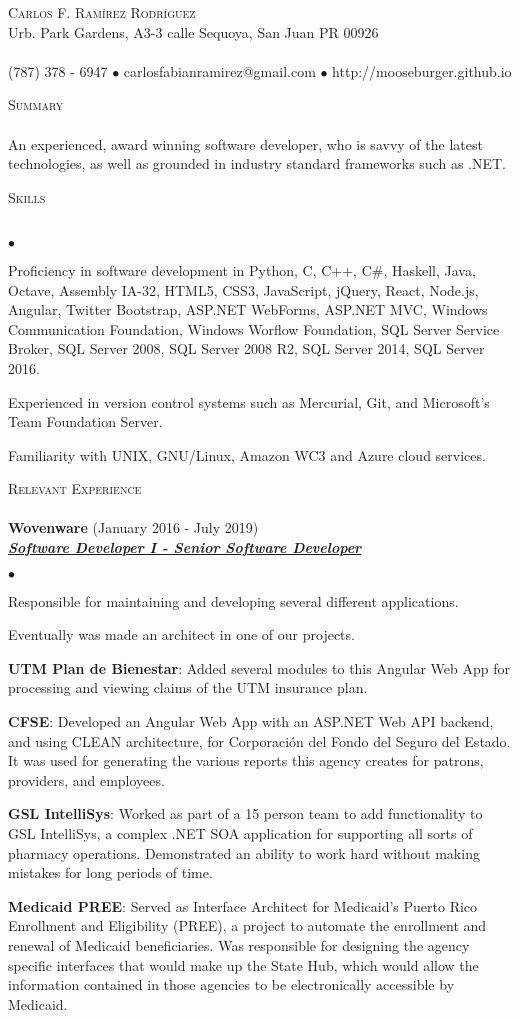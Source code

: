 \documentclass{article}
\newcommand{\lineunder}{\vspace*{-8pt} \\ \hspace*{-18pt} \hrulefill \\}
\newcommand{\header}[1]{{\hspace*{-15pt}\vspace*{6pt} \textsc{#1}} \vspace*{-6pt} \lineunder}
\newcommand{\employer}[3]{{ \textbf{#1} (#2)\\ \underline{\textbf{\emph{#3}}}\\  }}
\newcommand{\contact}[3]{
\vspace*{-8pt}
\begin{center}
{\LARGE \scshape {#1}}\\
#2 \lineunder 
#3
\end{center}
\vspace*{-8pt}
}
\newenvironment{achievements}{\begin{list}{$\bullet$}{\topsep 0pt \itemsep -2pt}}{\vspace*{4pt}\end{list}}
\begin{document}
\small
\smallskip
\vspace*{-44pt}

\contact{Carlos F. Ram\'irez Rodr\'iguez}
{Urb. Park Gardens, A3-3 calle Sequoya, San Juan PR 00926}
{(787) 378 - 6947 $\bullet$ carlosfabianramirez@gmail.com $\bullet$ http://mooseburger.github.io}

\header{Summary}
An experienced, award winning software developer, who is savvy of the latest technologies, as well as grounded in industry standard frameworks such as .NET.  

\header{Skills}
\begin{achievements}
\item Proficiency in software development in Python, C, C++, C\string#, Haskell, Java, Octave, Assembly IA-32, HTML5, CSS3, JavaScript, jQuery, React, Node.js, Angular, Twitter Bootstrap, ASP.NET WebForms, ASP.NET MVC, Windows Communication Foundation, Windows Worflow Foundation, SQL Server Service Broker, SQL Server 2008, SQL Server 2008 R2, SQL Server 2014, SQL Server 2016.
\item Experienced in version control systems such as Mercurial, Git, and Microsoft's Team Foundation Server.
\item Familiarity with UNIX, GNU/Linux, Amazon WC3 and Azure cloud services.
\end{achievements}

\header{Relevant Experience}

\employer{Wovenware}{January 2016 - July 2019}{Software Developer I - Senior Software Developer}
	\begin{achievements}
	\item Responsible for maintaining and developing several different applications.
	\item Eventually was made an architect in one of our projects.
	\item \textbf{UTM Plan de Bienestar}: Added several modules to this Angular Web App for processing and viewing claims of the UTM insurance plan.
	\item \textbf{CFSE}: Developed an Angular Web App with an ASP.NET Web API backend, and using CLEAN architecture, for Corporaci\'on del Fondo del Seguro del Estado. It was used for generating the various reports this agency creates for patrons, providers, and employees.
	\item \textbf{GSL IntelliSys}: Worked as part of a 15 person team to add functionality to GSL IntelliSys, a complex .NET SOA application for supporting all sorts of pharmacy operations. Demonstrated an ability to work hard without making mistakes for long periods of time.
	\item \textbf{Medicaid PREE}: Served as Interface Architect for Medicaid's Puerto Rico Enrollment and Eligibility (PREE), a project to automate the enrollment and renewal of Medicaid beneficiaries. Was responsible for designing the agency specific interfaces that would make up the State Hub, which would allow the information contained in those agencies to be electronically accessible by Medicaid. 
	\end{achievements}
\end{document}
